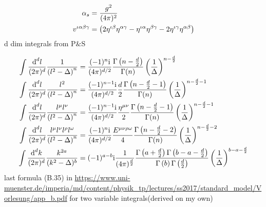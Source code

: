 \ifdefined\mainprogram{}
\else

\fi

\begin{align}
	\alpha_s &= \frac{g^2}{(4\pi)^2}
	\\
	v^{\iota\alpha\beta\gamma}
	&=\left(2\eta^{\iota\beta}\eta^{\alpha\gamma}
	-\eta^{\iota\alpha}\eta^{\beta\gamma}-
	2\eta^{\iota\gamma}\eta^{\alpha\beta}\right)
\end{align}
d dim integrals from P$\&$S

\begin{align}
\int \frac{\text{d} ^d l}{(2\pi)^d} \frac{1}{\left(l^2-\Delta\right)^n} 
&=
\frac{(-1)^n\text{i}}{(4\pi)^{d/2}} \frac{\Gamma\left(n-\frac{d}{2}\right)}{\Gamma(n)}\left(\frac{1}{\Delta}\right)^{n-\frac{d}{2}}
\\
\int \frac{\text{d} ^d l}{(2\pi)^d} \frac{l^2}{\left(l^2-\Delta\right)^n} 
&=
\frac{(-1)^{n-1}\text{i}}{(4\pi)^{d/2}}\frac{d}{2} \frac{\Gamma\left(n-\frac{d}{2}-1\right)}{\Gamma(n)}\left(\frac{1}{\Delta}\right)^{n-\frac{d}{2}-1}
\\
\int \frac{\text{d} ^d l}{(2\pi)^d} \frac{l^	\mu l^\nu}{\left(l^2-\Delta\right)^n} 
&=
\frac{(-1)^{n-1}\text{i}}{(4\pi)^{d/2}}\frac{\eta^{\mu \nu}}{2} \frac{\Gamma\left(n-\frac{d}{2}-1\right)}{\Gamma(n)}\left(\frac{1}{\Delta}\right)^{n-\frac{d}{2}-1}
\\
\int \frac{\text{d} ^d l}{(2\pi)^d} \frac{l^	\mu l^\nu l^\rho l^\omega}{\left(l^2-\Delta\right)^n} 
&=
\frac{(-1)^{n}\text{i}}{(4\pi)^{d/2}}\frac{E^{\mu \nu \rho \omega}}{4} \frac{\Gamma\left(n-\frac{d}{2}-2\right)}{\Gamma(n)}\left(\frac{1}{\Delta}\right)^{n-\frac{d}{2}-2}
\\
\int \frac{\text{d} ^d k}{(2\pi)^d}\frac{k^{2a}}{(k^2-\Delta)^b}
&=
(-1)^{a-b}\text{i} \frac{1}{(4\pi)^{\frac{d}{2}} } \frac{\Gamma\left(a+\frac{d}{2}\right)\Gamma\left(b-a-\frac{d}{2}\right)}{\Gamma\left(b\right)\Gamma\left(\frac{d}{2}\right)}\left(\frac{1}{\Delta}\right)^{b-a-\frac{d}{2}}
\end{align}
last formula (B.35) in \url{https://www.uni-muenster.de/imperia/md/content/physik_tp/lectures/ss2017/standard_model/Vorlesung/app_b.pdf}
for two variable integrals(derived on my own)
